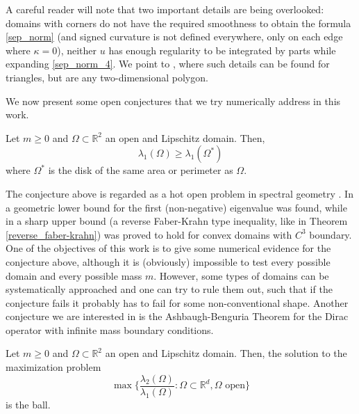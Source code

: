 \begin{remark}
    A careful reader will note that two important details are being overlooked: domains with corners do not have the required smoothness to obtain the formula \eqref{sep_norm} (and signed curvature is not defined everywhere, only on each edge where \(\kappa=0\)), neither \(u\) has enough regularity to be integrated by parts while expanding \eqref{sep_norm_4}. We point to \cite{vu2023spectral}, where such details can be found for triangles, but are any two-dimensional polygon.
\end{remark}

We now present some open conjectures that we try numerically address in this work.

\begin{conjecture}\label{conjecture_faber_krahn}
    Let \(m \geq 0\) and \(\Omega \subset \mathbb{R}^2\) an open and Lipschitz domain. Then,
    \[
    \lambda_1(\Omega) \geq \lambda_1(\Omega^\ast)
    \]
    where \(\Omega^\ast\) is the disk of the same area or perimeter as \(\Omega\).
\end{conjecture}

The conjecture above is regarded as a hot open problem in spectral geometry \cite{krejcirik_larson_lotoreichik_2019}. In \cite{benguria2017spectral} a geometric lower bound for the first (non-negative) eigenvalue was found, while in \cite{lotoreichik2019sharp} a sharp upper bound (a reverse Faber-Krahn type inequality, like in Theorem \ref*{reverse_faber-krahn}) was proved to hold for convex domains with \(C^3\) boundary. One of the objectives of this work is to give some numerical evidence for the conjecture above, although it is (obviously) impossible to test every possible domain and every possible mass \(m\). However, some types of domains can be systematically approached and one can try to rule them out, such that if the conjecture fails it probably has to fail for some non-conventional shape. Another conjecture we are interested in is the Ashbaugh-Benguria Theorem for the Dirac operator with infinite mass boundary conditions.

\begin{conjecture}\label{conjecture_benguria}
    Let \(m \geq 0\) and \(\Omega \subset \mathbb{R}^2\) an open and Lipschitz domain. Then, the solution to the maximization problem 
    \[
    \max \Big\{\frac{\lambda_2(\Omega)}{\lambda_1(\Omega)}: \Omega \subset \mathbb{R}^d, \Omega \text{ open} \Big\}
    \]
    is the ball.
\end{conjecture}


